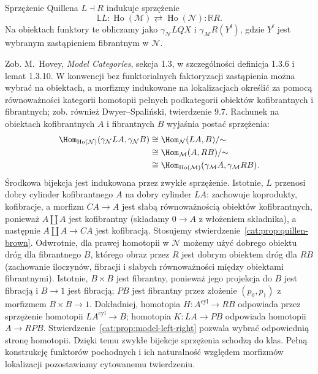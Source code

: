\begin{twierdzenie}\label{cat:thm:quillen-derived-adjunction}
Sprzężenie Quillena $L\dashv R$ indukuje sprzężenie
\[
 \mathbb L L:\operatorname{Ho}(\mathcal M)
 \rightleftarrows\operatorname{Ho}(\mathcal N):\mathbb R R.
\]
Na obiektach funktory te obliczamy jako $\gamma_{\mathcal N}LQX$ i $\gamma_{\mathcal M}R(Y^{\mathrm f})$, gdzie $Y^{\mathrm f}$ jest wybranym zastąpieniem fibrantnym w $\mathcal N$.
\end{twierdzenie}
Zob. M.~Hovey, \emph{Model Categories}, sekcja 1.3, w szczególności definicja 1.3.6 i lemat 1.3.10. W konwencji bez funktorialnych faktoryzacji zastąpienia można wybrać na obiektach, a morfizmy indukowane na lokalizacjach określić za pomocą równoważności kategorii homotopii pełnych podkategorii obiektów kofibrantnych i fibrantnych; zob. również Dwyer--Spaliński, twierdzenie 9.7. Rachunek na obiektach kofibrantnych $A$ i fibrantnych $B$ wyjaśnia postać sprzężenia:
\[
\begin{aligned}
 \Hom_{\operatorname{Ho}(\mathcal N)}(\gamma_{\mathcal N}LA,\gamma_{\mathcal N}B)
 &\cong\Hom_{\mathcal N}(LA,B)/{\sim}\\
 &\cong\Hom_{\mathcal M}(A,RB)/{\sim}\\
 &\cong\Hom_{\operatorname{Ho}(\mathcal M)}(\gamma_{\mathcal M}A,\gamma_{\mathcal M}RB).
\end{aligned}
\]
Środkowa bijekcja jest indukowana przez zwykłe sprzężenie. Istotnie, $L$ przenosi dobry cylinder kofibrantnego $A$ na dobry cylinder $LA$: zachowuje koprodukty, kofibracje, a morfizm $CA\to A$ jest słabą równoważnością obiektów kofibrantnych, ponieważ $A\amalg A$ jest kofibrantny (składamy $0\to A$ z włożeniem składnika), a następnie $A\amalg A\to CA$ jest kofibracją. Stosujemy stwierdzenie~\ref{cat:prop:quillen-brown}. Odwrotnie, dla prawej homotopii w $\mathcal N$ możemy użyć dobrego obiektu dróg dla fibrantnego $B$, którego obraz przez $R$ jest dobrym obiektem dróg dla $RB$ (zachowanie iloczynów, fibracji i słabych równoważności między obiektami fibrantnymi). Istotnie, $B\times B$ jest fibrantny, ponieważ jego projekcja do $B$ jest fibracją i $B\to1$ jest fibracją; $PB$ jest fibrantny przez złożenie $(p_0,p_1)$ z morfizmem $B\times B\to1$. Dokładniej, homotopia $H:A^{\mathrm{cyl}}\to RB$ odpowiada przez sprzężenie homotopii $LA^{\mathrm{cyl}}\to B$; homotopia $K:LA\to PB$ odpowiada homotopii $A\to RPB$. Stwierdzenie~\ref{cat:prop:model-left-right} pozwala wybrać odpowiednią stronę homotopii. Dzięki temu zwykłe bijekcje sprzężenia schodzą do klas. Pełną konstrukcję funktorów pochodnych i ich naturalność względem morfizmów lokalizacji pozostawiamy cytowanemu twierdzeniu.

